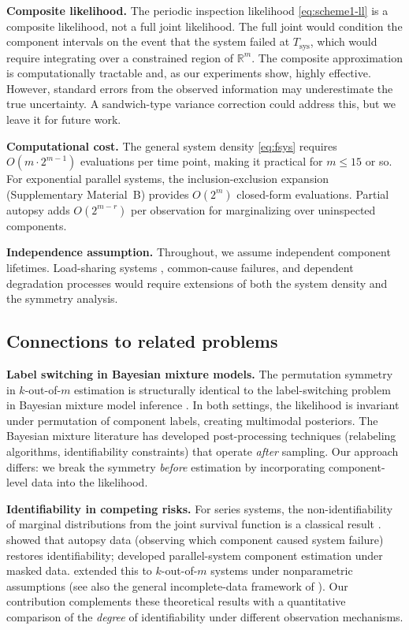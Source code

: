 \documentclass[12pt]{article}
\newcommand{\Tsys}{T_{\mathrm{sys}}}
\begin{document}
\textbf{Composite likelihood.}
The periodic inspection likelihood \eqref{eq:scheme1-ll} is a composite
likelihood, not a full joint likelihood.  The full joint would condition
the component intervals on the event that the system failed at $\Tsys$,
which would require integrating over a constrained region of
$\mathbb{R}^m$.  The composite approximation is computationally
tractable and, as our experiments show, highly effective.  However,
standard errors from the observed information may underestimate the
true uncertainty.  A sandwich-type variance correction
\citep{VarinReidFirth2011} could address this, but we leave it for
future work.

\textbf{Computational cost.}
The general system density \eqref{eq:fsys} requires $O(m \cdot 2^{m-1})$
evaluations per time point, making it practical for $m \leq 15$ or so.
For exponential parallel systems, the inclusion-exclusion expansion
(Supplementary Material~B) provides $O(2^m)$ closed-form evaluations.
Partial autopsy adds $O(2^{m-r})$ per observation for marginalizing over
uninspected components.

\textbf{Independence assumption.}
Throughout, we assume independent component lifetimes.  Load-sharing
systems \citep{Park2013}, common-cause failures, and dependent degradation
processes would require extensions of both the system density and the
symmetry analysis.

\subsection{Connections to related problems}\label{sec:connections}

\textbf{Label switching in Bayesian mixture models.}
The permutation symmetry in $k$-out-of-$m$ estimation is structurally
identical to the label-switching problem in Bayesian mixture model inference
\citep{Stephens2000, JasraHolmesStephens2005}.  In both settings,
the likelihood is invariant under permutation of component labels, creating
multimodal posteriors.  The Bayesian mixture literature has developed
post-processing techniques (relabeling algorithms, identifiability
constraints) that operate \emph{after} sampling.  Our approach differs:
we break the symmetry \emph{before} estimation by incorporating
component-level data into the likelihood.

\textbf{Identifiability in competing risks.}
For series systems, the non-identifiability of marginal distributions from
the joint survival function is a classical result \citep{Tsiatis1975,
Cox1959}.  \citet{Meilijson1981} showed that autopsy data (observing which
component caused system failure) restores identifiability;
\citet{SarhanElBassiouny2003} developed parallel-system component
estimation under masked data.
\citet{Komarova2017} extended this to $k$-out-of-$m$ systems under
nonparametric assumptions (see also the general incomplete-data framework
of \citealp{DempsterLairdRubin1977}).  Our contribution complements these theoretical
results with a quantitative comparison of the \emph{degree} of identifiability
under different observation mechanisms.
\end{document}

